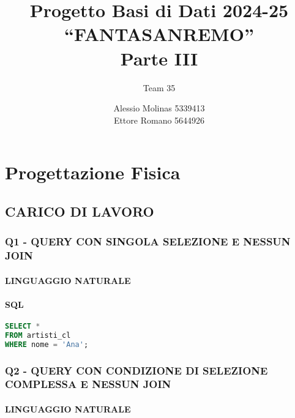 \documentclass[a4paper]{article}
\title{Progetto Basi di Dati 2024-25 \\
“FANTASANREMO” \\
Parte III}
\author{Team 35
	\\
	\and Alessio Molinas 5339413\\Ettore Romano 5644926}
\date{}
\begin{document}
\maketitle


\section{Progettazione Fisica\\}

\subsection{CARICO DI LAVORO\\}

\subsubsection{Q1 - QUERY CON SINGOLA SELEZIONE E NESSUN JOIN\\}

\paragraph*{LINGUAGGIO NATURALE \\} 



\paragraph*{SQL \\}

\begin{lstlisting}[language=SQL]
SELECT *
FROM artisti_cl
WHERE nome = 'Ana';
\end{lstlisting}



\subsubsection{Q2 - QUERY CON CONDIZIONE DI SELEZIONE COMPLESSA E NESSUN JOIN\\}

\paragraph*{LINGUAGGIO NATURALE\\}
\end{document}
